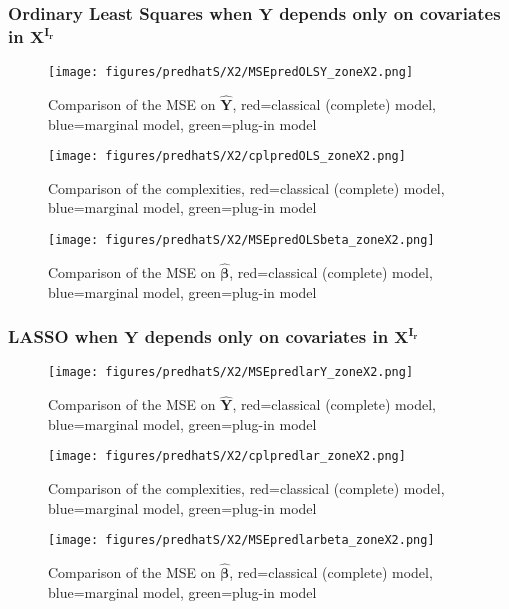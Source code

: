 \documentclass[12pt,a4paper]{report}
\begin{document}
\clearpage


\FloatBarrier

\newpage

\subsubsection{Ordinary Least Squares when $\boldsymbol{Y}$ depends only on covariates in $\boldsymbol{X^{I_r}}$}

	\begin{figure}[h!]
	\centering
		  \texttt{[image: figures/predhatS/X2/MSEpredOLSY\_zoneX2.png]}
		\caption{Comparison of the MSE on $\hat{\boldsymbol{Y}}$, red=classical (complete) model, blue=marginal model, green=plug-in model}\label{MSEpredOLSY_zoneX2}
	\end{figure}
	\begin{figure}[h!]
	\centering
		  \texttt{[image: figures/predhatS/X2/cplpredOLS\_zoneX2.png]}
		\caption{Comparison of the complexities, red=classical (complete) model, blue=marginal model, green=plug-in model}\label{cplpredOLS_zoneX2}
	\end{figure}
	\begin{figure}[h!]
	\centering
		  \texttt{[image: figures/predhatS/X2/MSEpredOLSbeta\_zoneX2.png]}
		\caption{Comparison of the MSE on $\hat{\boldsymbol{\beta}}$, red=classical (complete) model, blue=marginal model, green=plug-in model}\label{MSEpredOLSbeta_zoneX2}
	\end{figure}
	\FloatBarrier
\newpage
\subsubsection{LASSO when $\boldsymbol{Y}$ depends only on covariates in $\boldsymbol{X^{I_r}}$}

	\begin{figure}[h!]
	\centering
		  \texttt{[image: figures/predhatS/X2/MSEpredlarY\_zoneX2.png]}
		\caption{Comparison of the MSE on $\hat{\boldsymbol{Y}}$, red=classical (complete) model, blue=marginal model, green=plug-in model}\label{MSEpredlarY_zoneX2}
	\end{figure}
	\begin{figure}[h!]
	\centering
		  \texttt{[image: figures/predhatS/X2/cplpredlar\_zoneX2.png]}
		\caption{Comparison of the complexities, red=classical (complete) model, blue=marginal model, green=plug-in model}\label{cplpredlar_zoneX2}
	\end{figure}
	\begin{figure}[h!]
	\centering
		  \texttt{[image: figures/predhatS/X2/MSEpredlarbeta\_zoneX2.png]}
		\caption{Comparison of the MSE on $\hat{\boldsymbol{\beta}}$, red=classical (complete) model, blue=marginal model, green=plug-in model}\label{MSEpredlarbeta_zoneX2}
	\end{figure}
	\FloatBarrier
\newpage
\end{document}
